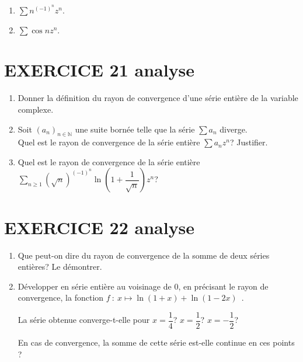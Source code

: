 \documentclass[10pt,oneside]{article}
\begin{document}
\begin{flushleft}
\begin{enumerate}
\begin{enumerate}
\item  $\displaystyle\sum n^{\left( -1\right)^{n}} z^{n}$.

\item
$\displaystyle\sum \cos nz^{n}$.
\end{enumerate}
\end{enumerate}

\section*{EXERCICE 21 \:analyse  }

\begin{enumerate}


\item  Donner la définition du rayon de convergence d'une série entière de la variable complexe.
\item
Soit $\left( a_{n}\right) _{n\in \mathbb{N}}$ une suite born\'{e}e telle que la s\'{e}rie $\displaystyle\sum a_{n}$ diverge.\\ Quel est le rayon de convergence de la s\'{e}rie enti\`{e}re $\displaystyle\sum a_{n}z^{n}$? Justifier.
\item Quel est le rayon de convergence de la s\'{e}rie enti\`{e}re $\displaystyle\sum \limits_{n\geqslant 1}^{}\left( \sqrt{n}\right)^{(-1)^n} \ln \left(1+\dfrac{1}{\sqrt{n}} \right)  z^{n}$? 
\end{enumerate}


\section*{EXERCICE 22 \:analyse }


\begin{enumerate}
\item Que peut-on dire du rayon de convergence de la somme de deux s\'eries enti\`{e}res? Le d\'emontrer.\\


\item D\'{e}velopper en s\'{e}rie enti\`{e}re au voisinage de $0$, en pr\'ecisant le rayon de convergence, la fonction $f\ :\ x\longmapsto \ln \left( 1+x\right)+\ln \left( 1-2x\right)$~.
\bigskip

La s\'{e}rie obtenue converge-t-elle pour $x=\dfrac{1}{4}$? $x=\dfrac{1}{2}$? $x=-\dfrac{1}{2}$?

 En cas de convergence, la somme de cette série est-elle continue en ces points ?
\\

\end{enumerate}



\end{flushleft}
\end{document}
